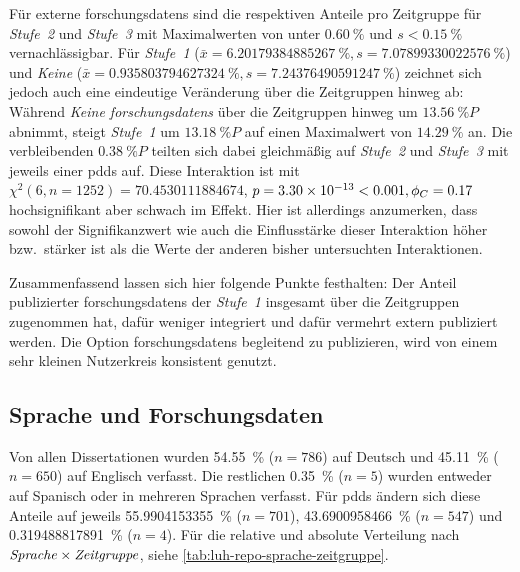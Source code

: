 Für externe \glspl{forschungsdaten} sind die respektiven Anteile pro Zeitgruppe für \textit{Stufe~2} und \textit{Stufe~3} mit Maximalwerten von unter $\SI{0,60}{\percent}$ und $s<\SI{0,15}{\percent}$ vernachlässigbar.
Für \textit{Stufe~1} ($\bar{x}=\SI[round-mode=places,round-precision=2]{6.20179384885267}{\percent},s=\SI[round-mode=places,round-precision=2]{7.07899330022576}{\percent}$) und \textit{Keine} ($\bar{x}=\SI[round-mode=places,round-precision=2]{0.935803794627324}{\percent},s=\SI[round-mode=places,round-precision=2]{7.24376490591247}{\percent}$) zeichnet sich jedoch auch eine eindeutige Veränderung über die Zeitgruppen hinweg ab:
Während \textit{Keine \glspl{forschungsdaten}} über die Zeitgruppen hinweg um $\SI[round-mode=places,round-precision=2]{13.56}{\percent P}$ abnimmt, steigt \textit{Stufe~1} um $\SI[round-mode=places,round-precision=2]{13.18}{\percent P}$ auf einen Maximalwert von $\SI[round-mode=places,round-precision=2]{14.29}{\percent}$ an.
Die verbleibenden $\SI[round-mode=places,round-precision=2]{0.38}{\percent P}$ teilten sich dabei gleichmäßig auf \textit{Stufe~2} und \textit{Stufe~3} mit jeweils einer \glspl{pdd} auf.
Diese Interaktion ist mit $\chi^2 (\num{6}, n=\num{1252}) = \num[round-mode=places,round-precision=2]{70.4530111884674}$, $p = \num[round-mode=places,round-precision=2]{3.3012369430121E-13}<\num{0.001},\phi_C=\num[round-mode=places,round-precision=2]{0.167738446925158}$ hochsignifikant aber schwach im Effekt.
Hier ist allerdings anzumerken, dass sowohl der Signifikanzwert wie auch die Einflusstärke dieser Interaktion höher bzw.~stärker ist als die Werte der anderen bisher untersuchten Interaktionen.

Zusammenfassend lassen sich hier folgende Punkte festhalten:
Der Anteil publizierter \glspl{forschungsdaten} der \textit{Stufe~1} insgesamt über die Zeitgruppen zugenommen hat, dafür weniger integriert und dafür vermehrt extern publiziert werden.
Die Option \glspl{forschungsdaten} begleitend zu publizieren, wird von einem sehr kleinen Nutzerkreis konsistent genutzt.

\subsection{Sprache und Forschungsdaten}\label{sec:luh-repo-results-language}
Von allen Dissertationen wurden \SI[round-mode=places,round-precision=2]{54.55}{\percent} ($n=\num{786}$) auf Deutsch und \SI[round-mode=places,round-precision=2]{45,11}{\percent} ($n=\num{650}$) auf Englisch verfasst.
Die restlichen \SI[round-mode=places,round-precision=2]{0.35}{\percent} ($n=\num{5}$) wurden entweder auf Spanisch oder in mehreren Sprachen verfasst.
Für \glspl{pdd} ändern sich diese Anteile auf jeweils \SI[round-mode=places,round-precision=2]{55.9904153355}{\percent} ($n=\num{701}$), \SI[round-mode=places,round-precision=2]{43.6900958466}{\percent} ($n=\num{547}$) und \SI[round-mode=places,round-precision=2]{0.319488817891}{\percent} ($n=\num{4}$).
Für die relative und absolute Verteilung nach $\text{\textit{Sprache}}\times\text{\textit{Zeitgruppe}}$, siehe \cref{tab:luh-repo-sprache-zeitgruppe}.

